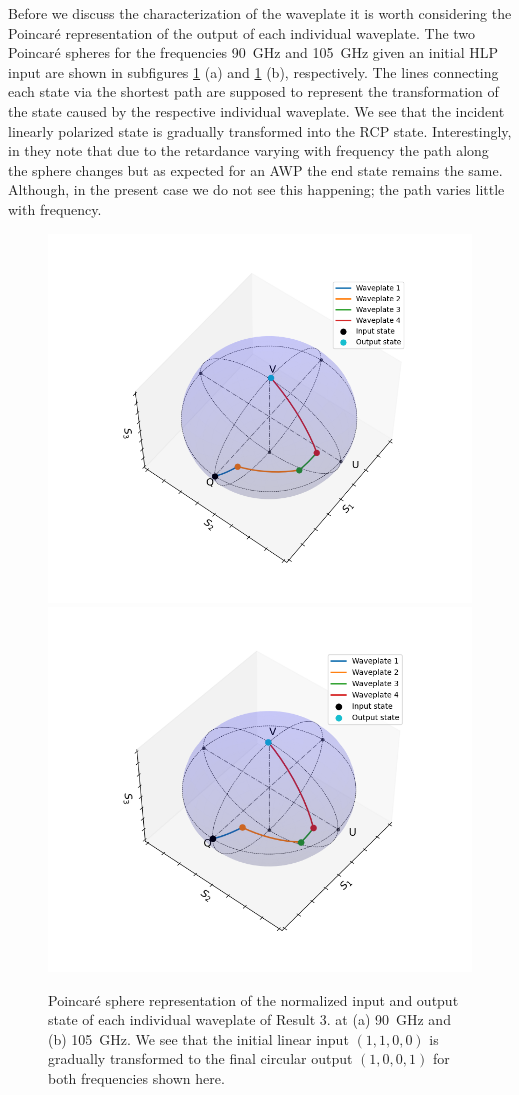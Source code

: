 Before we discuss the characterization of the waveplate it is worth considering the Poincaré representation of the output of each individual waveplate. The two Poincaré spheres for the frequencies \SI{90}{\giga \hertz} and \SI{105}{\giga \hertz} given an initial HLP input are shown in subfigures \ref{fig:res3_poincare} (a) and \ref{fig:res3_poincare} (b), respectively. The lines connecting each state via the shortest path are supposed to represent the transformation of the state caused by the respective individual waveplate. We see that the incident linearly polarized state is gradually transformed into the RCP state. Interestingly, in \cite{Masson2006} they note that due to the retardance varying with frequency the path along the sphere changes but as expected for an AWP the end state remains the same. Although, in the present case we do not see this happening; the path varies little with frequency. 

\begin{figure}[H]
    \centering
    \subcaptionbox{\label{fig:res3_poincare_90ghz}}
        {\includegraphics[width=0.49\linewidth]{images/results/plots/polymer/poincare/Poincare_Res3_90GHz.png}}
    \subcaptionbox{\label{fig:res3_poincare_105ghz}}
        {\includegraphics[width=0.49\linewidth]{images/results/plots/polymer/poincare/Poincare_Res3_105GHz.png}}
    \caption{Poincaré sphere representation of the normalized input and output state of each individual waveplate of Result 3. at (a) \SI{90}{\giga \hertz} and (b) \SI{105}{\giga \hertz}. We see that the initial linear input $(1,1,0,0)$ is gradually transformed to the final circular output $(1,0,0,1)$ for both frequencies shown here.}
    \label{fig:res3_poincare}
\end{figure}

